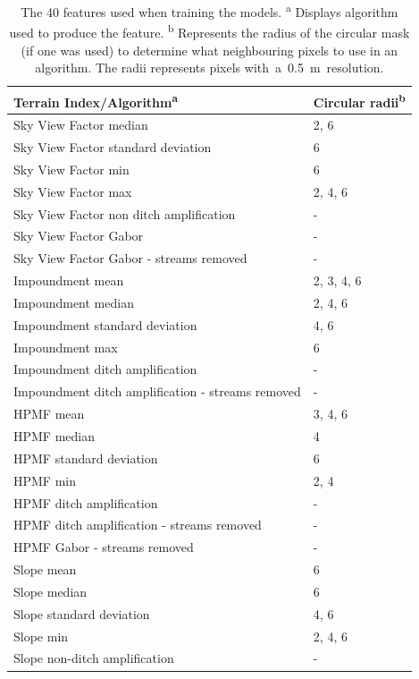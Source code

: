 \documentclass[11pt, review]{elsarticle} %
\begin{document}
\begin{table} [!htb]
\centering
    {\begin{tabular}{l|l}
      \textbf{Terrain Index/Algorithm}\textsuperscript{a} & \textbf{Circular radii}\textsuperscript{b} \\ %
      \hline
      Sky View Factor median &2, 6 \\
      Sky View Factor standard deviation & 6 \\
      Sky View Factor min & 6 \\
      Sky View Factor max & 2, 4, 6 \\
      Sky View Factor non ditch amplification & - \\ 
      Sky View Factor Gabor & - \\
      Sky View Factor Gabor - streams removed & -\\
      
      Impoundment mean & 2, 3, 4, 6 \\
      Impoundment median & 2, 4, 6 \\
      Impoundment standard deviation & 4, 6 \\
      Impoundment max & 6 \\
      Impoundment ditch amplification & - \\
      Impoundment ditch amplification - streams removed & - \\
      
      HPMF mean & 3, 4, 6 \\
      HPMF median & 4 \\
      HPMF standard deviation & 6 \\
      HPMF min & 2, 4 \\
      HPMF ditch amplification & - \\
      HPMF ditch amplification - streams removed & - \\
      HPMF Gabor - streams removed & -\\
      
      Slope mean & 6 \\
      Slope median & 6 \\
      Slope standard deviation & 4, 6 \\
      Slope min & 2, 4, 6 \\
      Slope non-ditch amplification & - \\
      \hline
    \end{tabular}}
    \caption{ The 40 features used when training the models.
    \newline \textsuperscript{a} Displays algorithm used to produce the feature. \newline
        \textsuperscript{b} Represents the radius of the circular mask (if one was used) to determine \newline what neighbouring pixels to use in an algorithm. The radii represents pixels \newline \mbox{with a 0.5 m resolution.\itshape\ignorespaces}}
    \label{featuretable}
\end{table}
\end{document}
